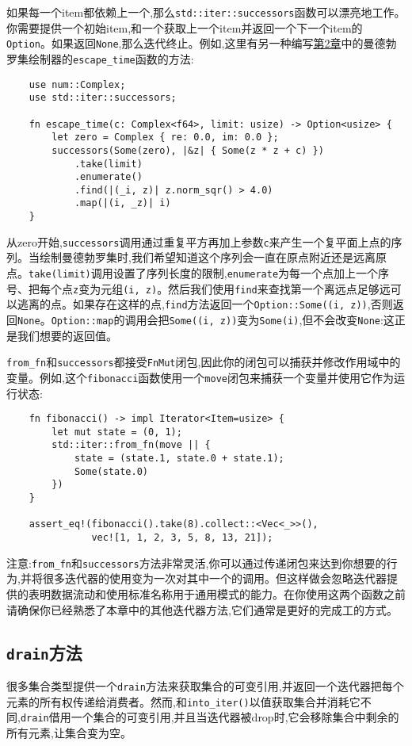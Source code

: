 如果每一个item都依赖上一个,那么\texttt{std::iter::successors}函数可以漂亮地工作。你需要提供一个初始item,和一个获取上一个item并返回一个下一个item的\texttt{Option}。如果返回\texttt{None},那么迭代终止。例如,这里有另一种编写\hyperref[ch02]{第2章}中的曼德勃罗集绘制器的\texttt{escape\_time}函数的方法:
\begin{verbatim}
    use num::Complex;
    use std::iter::successors;

    fn escape_time(c: Complex<f64>, limit: usize) -> Option<usize> {
        let zero = Complex { re: 0.0, im: 0.0 };
        successors(Some(zero), |&z| { Some(z * z + c) })
            .take(limit)
            .enumerate()
            .find(|(_i, z)| z.norm_sqr() > 4.0)
            .map(|(i, _z)| i)
    }
\end{verbatim}

从zero开始,\texttt{successors}调用通过重复平方再加上参数\texttt{c}来产生一个复平面上点的序列。当绘制曼德勃罗集时,我们希望知道这个序列会一直在原点附近还是远离原点。\texttt{take(limit)}调用设置了序列长度的限制,\texttt{enumerate}为每一个点加上一个序号、把每个点\texttt{z}变为元组\texttt{(i, z)}。然后我们使用\texttt{find}来查找第一个离远点足够远可以逃离的点。如果存在这样的点,\texttt{find}方法返回一个\texttt{Option::Some((i, z))},否则返回\texttt{None}。\texttt{Option::map}的调用会把\texttt{Some((i, z))}变为\texttt{Some(i)},但不会改变\texttt{None}:这正是我们想要的返回值。

\texttt{from\_fn}和\texttt{successors}都接受\texttt{FnMut}闭包,因此你的闭包可以捕获并修改作用域中的变量。例如,这个\texttt{fibonacci}函数使用一个\texttt{move}闭包来捕获一个变量并使用它作为运行状态:
\begin{verbatim}
    fn fibonacci() -> impl Iterator<Item=usize> {
        let mut state = (0, 1);
        std::iter::from_fn(move || {
            state = (state.1, state.0 + state.1);
            Some(state.0)
        })
    }

    assert_eq!(fibonacci().take(8).collect::<Vec<_>>(),
               vec![1, 1, 2, 3, 5, 8, 13, 21]);
\end{verbatim}

注意:\texttt{from\_fn}和\texttt{successors}方法非常灵活,你可以通过传递闭包来达到你想要的行为,并将很多迭代器的使用变为一次对其中一个的调用。但这样做会忽略迭代器提供的表明数据流动和使用标准名称用于通用模式的能力。在你使用这两个函数之前请确保你已经熟悉了本章中的其他迭代器方法,它们通常是更好的完成工的方式。

\subsection{\texttt{drain}方法}
很多集合类型提供一个\texttt{drain}方法来获取集合的可变引用,并返回一个迭代器把每个元素的所有权传递给消费者。然而,和\texttt{into\_iter()}以值获取集合并消耗它不同,\texttt{drain}借用一个集合的可变引用,并且当迭代器被drop时,它会移除集合中剩余的所有元素,让集合变为空。

